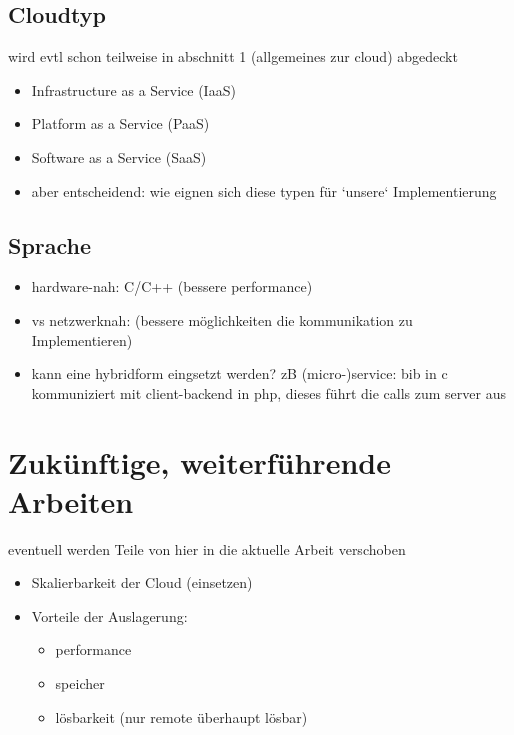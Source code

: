 \documentclass[a4paper,10pt]{article}
\begin{document}
\subsection{Cloudtyp}

wird evtl schon teilweise in abschnitt 1 (allgemeines zur cloud) abgedeckt

\begin{itemize}
 \item Infrastructure as a Service (IaaS)
 \item Platform as a Service (PaaS)
 \item Software as a Service (SaaS)
 \item aber entscheidend: wie eignen sich diese typen für `unsere` Implementierung
\end{itemize}

\subsection{Sprache}

\begin{itemize}
 \item hardware-nah: C/C++ (bessere performance)
 \item vs netzwerknah: (bessere möglichkeiten die kommunikation zu Implementieren)
 \item kann eine hybridform eingsetzt werden? 
 zB (micro-)service: bib in c kommuniziert mit client-backend in php, dieses führt die calls zum server aus
\end{itemize}

\newpage

\section{Zukünftige, weiterführende Arbeiten}

eventuell werden Teile von hier in die aktuelle Arbeit verschoben

\begin{itemize}
 \item Skalierbarkeit der Cloud (einsetzen)
 \item Vorteile der Auslagerung:
  \begin{itemize}
    \item performance
    \item speicher
    \item lösbarkeit (nur remote überhaupt lösbar)
  \end{itemize}

\end{itemize}
\end{document}
